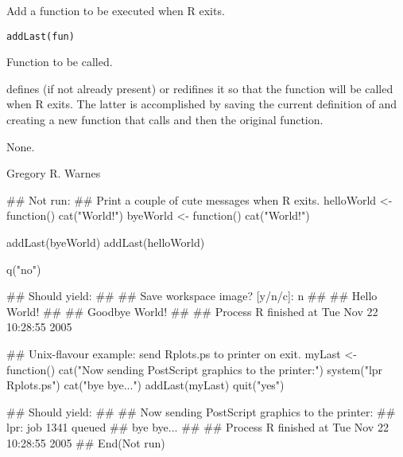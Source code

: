 \begin{Description}\relax
Add a function to be executed when R exits.
\end{Description}
\begin{Usage}
\begin{verbatim}
addLast(fun)
\end{verbatim}
\end{Usage}
\begin{Arguments}
\begin{ldescription}
\item[\code{fun}] Function to be called.
\end{ldescription}
\end{Arguments}
\begin{Details}\relax
{} defines  (if not already present) or redifines it
so that the function  will be called when R exits.  The
latter is accomplished by saving the current definition of  and
creating a new  function that calls  and then the
original  function.
\end{Details}
\begin{Value}
None.
\end{Value}
\begin{Author}\relax
Gregory R. Warnes 
\end{Author}
\begin{SeeAlso}\relax
{}
\end{SeeAlso}
\begin{Examples}
\begin{ExampleCode}

## Not run: 
## Print a couple of cute messages when R exits.
helloWorld <- function() cat("\nHello World!\n")
byeWorld <- function() cat("\nGoodbye World!\n")

addLast(byeWorld)
addLast(helloWorld)

q("no")

## Should yield:
##
##   Save workspace image? [y/n/c]: n
##
##   Hello World!
##
##   Goodbye World!
##
##   Process R finished at Tue Nov 22 10:28:55 2005

## Unix-flavour example: send Rplots.ps to printer on exit.
myLast <- function()
{
  cat("Now sending PostScript graphics to the printer:\n")
  system("lpr Rplots.ps")
  cat("bye bye...\n")
}
addLast(myLast)
quit("yes")

## Should yield:
##
##  Now sending PostScript graphics to the printer:
##  lpr: job 1341 queued
##  bye bye...
##
##   Process R finished at Tue Nov 22 10:28:55 2005
## End(Not run)

\end{ExampleCode}
\end{Examples}

